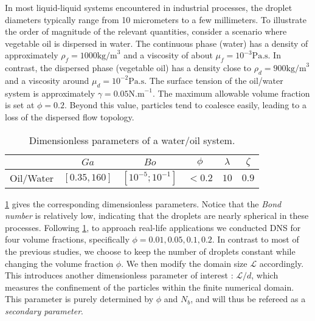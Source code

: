 In most liquid-liquid systems encountered in industrial processes, the droplet diameters typically range from 10 micrometers to a few millimeters. To illustrate the order of magnitude of the relevant quantities, consider a scenario where vegetable oil is dispersed in water. The continuous phase (water) has a density of approximately $\rho_f = 1000 \text{kg/m}^3$ and a viscosity of about $\mu_f = 10^{-3} \text{Pa.s}$. In contrast, the dispersed phase (vegetable oil) has a density close to $\rho_d = 900 \text{kg/m}^3$ and a viscosity around $\mu_d = 10^{-2} \text{Pa.s}$.
The surface tension of the oil/water system is approximately $\gamma = 0.05 \text{N.m}^{-1}$. The maximum allowable volume fraction is set at $\phi = 0.2$. Beyond this value, particles tend to coalesce easily, leading to a loss of the dispersed flow topology.%
\begin{table}[h!]
    \centering
    \caption{Dimensionless parameters of a water/oil system.}
    \begin{tabular}{|c||c|c|c|c|c|}
        \hline&$Ga$&$Bo$&$\phi$&$\lambda$&$\zeta$\\ \hline
        \hline Oil/Water&$[0.35,160]$&$[10^{-5};10^{-1}]$&$<0.2$&$10$&$0.9$\\ \hline
    \end{tabular}
    \label{tab:parameters_exp}
\end{table}
\ref{tab:parameters_exp} gives the corresponding dimensionless parameters.  
Notice that the \textit{Bond number} is relatively low, indicating that the droplets are nearly spherical in these processes.
Following \ref{tab:parameters_exp}, to approach real-life applications we conducted DNS for four volume fractions, specifically $\phi = 0.01,0.05,0.1,0.2$.
In contrast to most of the previous studies, we choose to keep the number of droplets constant while changing the volume fraction $\phi$. 
We then modify the domain size $\mathcal{L}$ accordingly. 
This introduces another dimensionless parameter of interest : $\mathcal{L}/d$, which measures the confinement of the particles within the finite numerical domain. 
This parameter is purely determined by $\phi$ and $N_b$, and will thus be refereed as a \textit{secondary parameter}.

